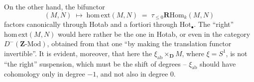 \documentclass[11pt]{article}
\newcommand{\D}{\mathbf{D}}
\newcommand{\Hot}{\mathrm{Hot}}
\newcommand{\homext}{\mathrm{hom}\,\mathrm{ext}}
\newcommand{\RHom}{\mathbf{R}\mathrm{Hom}}
\newcommand{\ab}{\mathrm{ab}}
\begin{document}
On the other hand, the bifunctor
\[
(M,N)\;\longmapsto\;\homext(M,N)\;=\;\tau_{\le 0}\RHom_k(M,N)
\]
factors canonically through Hotab and a fortiori through $\Hot_{\bullet}$. The ``right'' $\homext(M,N)$ would here rather be the one in Hotab, or even in the category $D^{-}(\mathbf{Z}\text{-Mod})$, obtained from that one ``by making the translation functor invertible''. It is evident, moreover, that here the $\xi_{\ab}\times_{\D}M$, where $\xi=S^1$, is not ``the right'' suspension, which must be the shift of degrees – $\xi_{\ab}$ should have cohomology only in degree $-1$, and not also in degree $0$.
\end{document}
